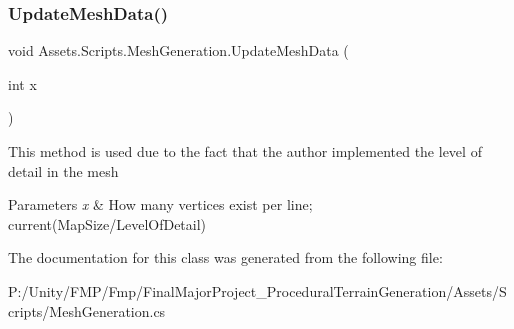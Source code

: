 \subsubsection{\texorpdfstring{UpdateMeshData()}{UpdateMeshData()}}
{\footnotesize\ttfamily void Assets.\+Scripts.\+Mesh\+Generation.\+Update\+Mesh\+Data (\begin{DoxyParamCaption}\item[{int}]{x }\end{DoxyParamCaption})}



This method is used due to the fact that the author implemented the level of detail in the mesh 


\begin{DoxyParams}{Parameters}
{\em x} & How many vertices exist per line; current(Map\+Size/\+Level\+Of\+Detail)\\
\hline
\end{DoxyParams}


The documentation for this class was generated from the following file\+:\begin{DoxyCompactItemize}
\item 
P\+:/\+Unity/\+F\+M\+P/\+Fmp/\+Final\+Major\+Project\+\_\+\+Procedural\+Terrain\+Generation/\+Assets/\+Scripts/Mesh\+Generation.\+cs\end{DoxyCompactItemize}
